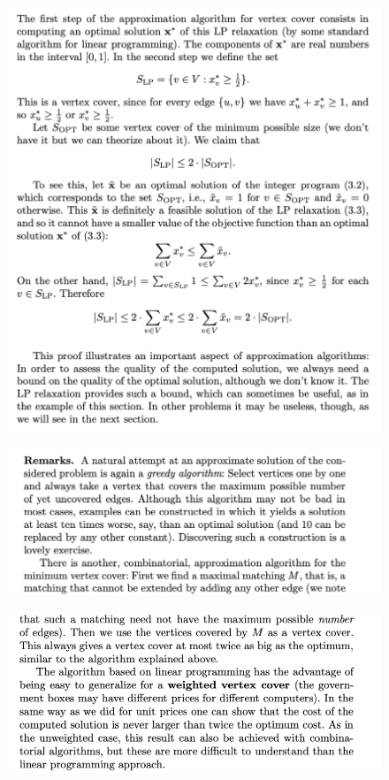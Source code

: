 \documentclass[12pt,a4paper]{amsart}
\theoremstyle{definition} %
\theoremstyle{plain} %
\begin{document}
\begin{figure}[ht]
\centering
\includegraphics[width=1\textwidth]{Picture2.png}
\end{figure}


\newpage

\begin{figure}[ht]
\centering
\includegraphics[width=1\textwidth]{Picture3.png}
\end{figure}

\begin{figure}[ht]
\centering
\includegraphics[width=1\textwidth]{Picture4.png}
\end{figure}
\end{document}
